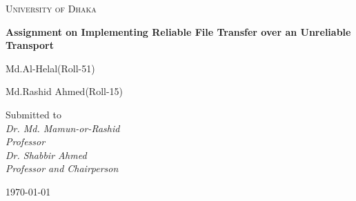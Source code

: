 \documentclass[12pt,a4paper]{report}
\begin{document}
\begin{titlepage}
\centering
{\scshape\LARGE University of Dhaka \par}
\vspace{1.5cm}
{\huge\bfseries Assignment on Implementing Reliable File Transfer over an Unreliable Transport\par}
\vspace{3cm}
{\Large\itshape \parbox{6cm}{\centering Md.Al-Helal(Roll-51)}\hspace{1cm}\parbox{8cm}{\centering Md.Rashid Ahmed(Roll-15)}}
\vfill
Submitted to\\
\vspace{0.5cm}
{\itshape Dr. Md. Mamun-or-Rashid \\ Professor\vspace{0.3cm} \\Dr. Shabbir Ahmed \\Professor and Chairperson}
\vfill
{\large \today\par}
\end{titlepage}
\end{document}
